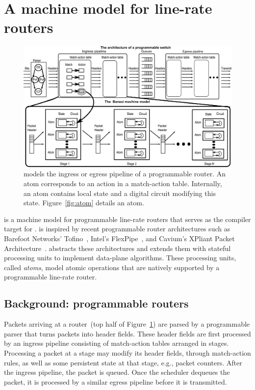 \section{A machine model for line-rate routers}
\label{s:absmachine}
\begin{figure}[!t]
  \includegraphics[width=\textwidth]{domino_banzai.pdf}
  \caption{\absmachine models the ingress or egress pipeline of a
  programmable router. An atom corresponds to an action in a match-action
  table. Internally, an atom contains local state and a digital circuit 
  modifying this state. Figure~\ref{fig:atom} details an atom.}
  \label{domino_fig:router}
\end{figure}

\absmachine is a machine model for programmable line-rate routers that serves
as the compiler target for \pktlanguage.  \absmachine is inspired by recent
programmable router architectures such as Barefoot Networks' Tofino~\cite{tofino},
Intel's FlexPipe~\cite{flexpipe}, and Cavium's XPliant Packet
Architecture~\cite{xpliant}. \absmachine abstracts these architectures and
extends them with stateful processing units to implement data-plane algorithms.
These processing units, called {\em atoms}, model atomic operations
that are natively supported by a programmable line-rate router.

\subsection{Background: programmable routers}
Packets arriving at a router~(top half of Figure~\ref{domino_fig:router}) are parsed
by a programmable parser that turns packets into header fields. These header
fields are first processed by an ingress pipeline consisting of match-action
tables arranged in stages. Processing a packet at a stage may modify its header
fields, through match-action rules, as well as some persistent state at that
stage, e.g., packet counters. After the ingress pipeline, the packet is
queued. Once the scheduler dequeues the packet, it is processed by a
similar egress pipeline before it is transmitted.

